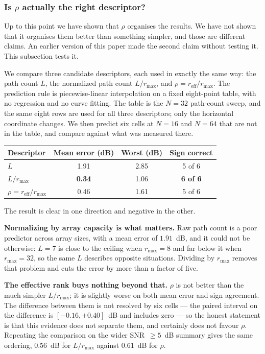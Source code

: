 \documentclass[journal]{IEEEtran}
\newcommand{\rmax}{r_{\mathrm{max}}}
\newcommand{\reff}{r_{\mathrm{eff}}}
\begin{document}
\subsubsection{Is $\rho$ actually the right descriptor?}

Up to this point we have shown that $\rho$ organises the results. We have not
shown that it organises them better than something simpler, and those are
different claims. An earlier version of this paper made the second claim
without testing it. This subsection tests it.

We compare three candidate descriptors, each used in exactly the same way: the
path count $L$, the normalized path count $L/\rmax$, and $\rho=\reff/\rmax$.
The prediction rule is piecewise-linear interpolation on a fixed eight-point
table, with no regression and no curve fitting. The table is the $N=32$
path-count sweep, and the same eight rows are used for all three descriptors;
only the horizontal coordinate changes. We then predict six cells at $N=16$ and
$N=64$ that are not in the table, and compare against what was measured there.

\begin{center}
\footnotesize
\begin{tabular}{lccc}
\toprule
Descriptor & Mean error (dB) & Worst (dB) & Sign correct \\
\midrule
$L$ & 1.91 & 2.85 & 5 of 6 \\
$L/\rmax$ & \textbf{0.34} & 1.06 & \textbf{6 of 6} \\
$\rho=\reff/\rmax$ & 0.46 & 1.61 & 5 of 6 \\
\bottomrule
\end{tabular}
\end{center}

The result is clear in one direction and negative in the other.

\textbf{Normalizing by array capacity is what matters.} Raw path count is a
poor predictor across array sizes, with a mean error of $1.91$~dB, and it could
not be otherwise: $L=7$ is close to the ceiling when $\rmax=8$ and far below it
when $\rmax=32$, so the same $L$ describes opposite situations. Dividing by
$\rmax$ removes that problem and cuts the error by more than a factor of five.

\textbf{The effective rank buys nothing beyond that.} $\rho$ is not better than
the much simpler $L/\rmax$; it is slightly worse on both mean error and sign
agreement. The difference between them is not resolved by six cells --- the
paired interval on the difference is $[-0.16,+0.40]$~dB and includes zero ---
so the honest statement is that this evidence does not separate them, and
certainly does not favour $\rho$. Repeating the comparison on the wider
SNR~$\ge5$~dB summary gives the same ordering, $0.56$~dB for $L/\rmax$ against
$0.61$~dB for $\rho$.
\end{document}
